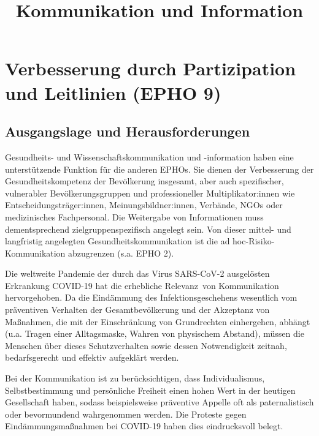 \documentclass{article}
\begin{document}
\title{Kommunikation und Information}

\maketitle


\section{Verbesserung durch Partizipation und Leitlinien (EPHO 9)}\label{H1345889}



\subsection{Ausgangslage und Herausforderungen}\label{H9652558}



Gesundheits- und Wissenschaftskommunikation und -information haben eine unterstützende Funktion für die anderen EPHOs. Sie dienen der Verbesserung der Gesundheitskompetenz der Bevölkerung insgesamt, aber auch spezifischer, vulnerabler Bevölkerungsgruppen und professioneller Multiplikator:innen wie Entscheidungsträger:innen, Meinungsbildner:innen, Verbände, NGOs oder medizinisches Fachpersonal. Die Weitergabe von Informationen muss dementsprechend zielgruppenspezifisch angelegt sein. Von dieser mittel- und langfristig angelegten Gesundheitskommunikation ist die ad hoc-Risiko-Kommunikation abzugrenzen (s.a. EPHO 2). 


Die weltweite Pandemie der durch das Virus SARS-CoV-2 ausgelösten Erkrankung COVID-19 hat die erhebliche Relevanz von Kommunikation hervorgehoben. Da die Eindämmung des Infektionsgeschehens wesentlich vom präventiven Verhalten der Gesamtbevölkerung und der Akzeptanz von Maßnahmen, die mit der Einschränkung von Grundrechten einhergehen, abhängt (u.a. Tragen einer Alltagsmaske, Wahren von physischem Abstand), müssen die Menschen über dieses Schutzverhalten sowie dessen Notwendigkeit zeitnah, bedarfsgerecht und effektiv aufgeklärt werden.


Bei der Kommunikation ist zu berücksichtigen, dass Individualismus, Selbstbestimmung und persönliche Freiheit einen hohen Wert in der heutigen Gesellschaft haben, sodass beispielsweise präventive Appelle oft als paternalistisch oder bevormundend wahrgenommen werden. Die Proteste gegen Eindämmungsmaßnahmen bei COVID-19 haben dies eindrucksvoll belegt.
\end{document}
